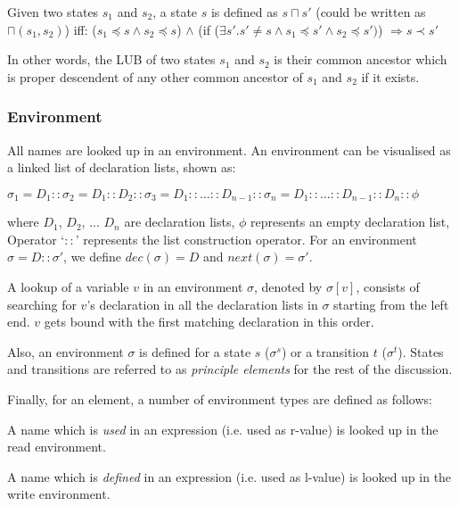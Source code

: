 \documentclass[12pt,a4paper]{article}
\begin{document}
\begin{definition} \label{d:lub}
	Given two states $s_1$ and $s_2$, a state $s$ is defined as $s \sqcap s'$ (could be written as $\sqcap(s_1, s_2)$) iff: ($s_1 \preceq s \wedge s_2 \preceq s$) $\wedge$ (if ($\exists s' . s' \neq s \wedge s_1 \preceq s' \wedge s_2 \preceq s')$) $\Rightarrow s \prec s'$ 
\end{definition}

In other words, the LUB of two states $s_1$ and $s_2$ is their common ancestor which is proper descendent of any other common ancestor of $s_1$ and $s_2$ if it exists.

\subsubsection{Environment}
All names are looked up in an environment. An environment can be visualised as a linked list of declaration lists, shown as:

$\sigma_1 = D_1 :: \sigma_2 = D_1 :: D_2 :: \sigma_3 = D_1 :: ... :: D_{n-1} :: \sigma_n  = D_1 :: ... :: D_{n-1} :: D_n :: \phi $

where $D_1$, $D_2$, ... $D_n$ are declaration lists, $\phi$ represents an empty declaration list, Operator `$::$' represents the list construction operator. For an environment $\sigma = D :: \sigma'$, we define $dec(\sigma) = D$ and $next(\sigma) = \sigma'$.

A lookup of a variable $v$ in an environment $\sigma$, denoted by $\sigma[v]$, consists of searching for $v$'s declaration in all the declaration lists in $\sigma$ starting from the left end. $v$ gets bound with the first matching declaration in this order.

Also, an environment $\sigma$ is defined for a state $s$ ($\sigma^s$) or a transition $t$ ($\sigma^t$). States and transitions are referred to as \emph{principle elements} for the rest of the discussion.

Finally, for an element, a number of environment types are defined as follows:

\begin{definition}
	A name which is \emph{used} in an expression (i.e. used as r-value) is looked up in the read environment. 
\end{definition}

\begin{definition}
	A name which is \emph{defined} in an expression (i.e. used as l-value) is looked up in the write environment. 
\end{definition}
\end{document}
